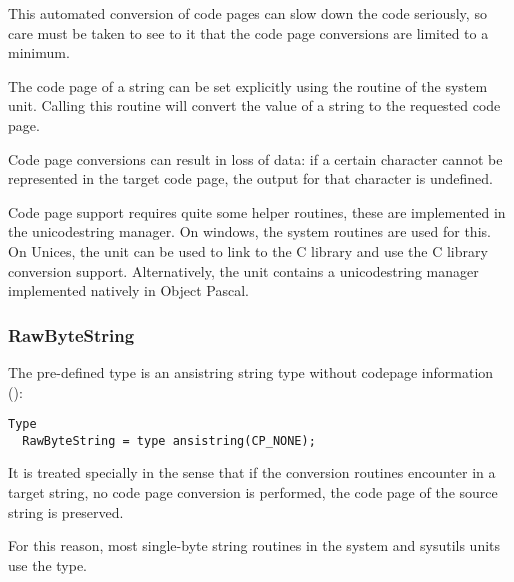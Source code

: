 This automated conversion of code pages can slow down the code seriously, so care must be 
taken to see to it that the code page conversions are limited to a minimum.

The code page of a string can be set explicitly using the  routine of the system unit.
Calling this routine will convert the value of a string to the requested code page.

\begin{remark}
Code page conversions can result in loss of data: if a certain character cannot be represented in the target 
code page, the output for that character is undefined.
\end{remark}

\begin{remark}
Code page support requires quite some helper routines, these are implemented in the unicodestring manager. 
On windows, the system routines are used for this. On Unices, the  unit can be used to link 
to the C library and use the C library conversion support. 
Alternatively, the  unit contains a unicodestring manager implemented natively in Object Pascal.
\end{remark}

\subsubsection{RawByteString}
The pre-defined  type is an ansistring string type without codepage information ():
\begin{verbatim}
Type
  RawByteString = type ansistring(CP_NONE);
\end{verbatim}
It is treated specially in the sense that if the conversion routines encounter  in a target string,
no code page conversion is performed, the code page of the source string is preserved.

For this reason, most single-byte string routines in the system and sysutils units use the  type.

